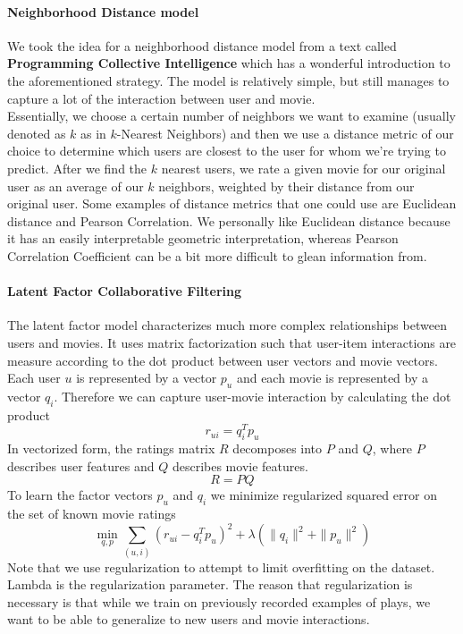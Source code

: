 \documentclass[fleqn,10pt]{SelfArx} %
\begin{document}
\paragraph{Neighborhood Distance model}
We took the idea for a neighborhood distance model from a text called \textbf{Programming Collective Intelligence} which has a wonderful introduction to the aforementioned strategy. The model is relatively simple, but still manages to capture a lot of the interaction between user and movie.\\

\noindent Essentially, we choose a certain number of neighbors we want to examine (usually denoted as $k$ as in $k$-Nearest Neighbors) and then we use a distance metric of our choice to determine which users are closest to the user for whom we're trying to predict. After we find the $k$ nearest users, we rate a given movie for our original user as an average of our $k$ neighbors, weighted by their distance from our original user. Some examples of distance metrics that one could use are Euclidean distance and Pearson Correlation. We personally like Euclidean distance because it has an easily interpretable geometric interpretation, whereas Pearson Correlation Coefficient can be a bit more difficult to glean information from.

\paragraph{Latent Factor Collaborative Filtering}
The latent factor model characterizes much more complex relationships between users and movies. It uses matrix factorization such that user-item interactions are measure according to the dot product between user vectors and movie vectors. Each user $u$ is represented by a vector $p_u$ and each movie is represented by a vector $q_i$. Therefore we can capture user-movie interaction by calculating the dot product
$$r_{ui} = q^T_ip_u$$
In vectorized form, the ratings matrix $R$ decomposes into $P$ and $Q$, where $P$ describes user features and $Q$ describes movie features.
$$R = PQ$$
To learn the factor vectors $p_u$ and $q_i$ we minimize regularized squared error on the set of known movie ratings
$$\min_{q,p} \sum_{(u,i)} \left(r_{ui} - q^T_ip_u\right)^2 + \lambda\left(\|q_i\|^2 + \|p_u\|^2\right)$$
Note that we use regularization to attempt to limit overfitting on the dataset. Lambda is the regularization parameter. The reason that regularization is necessary is that while we train on previously recorded examples of plays, we want to be able to generalize to new users and movie interactions.\\
\end{document}
